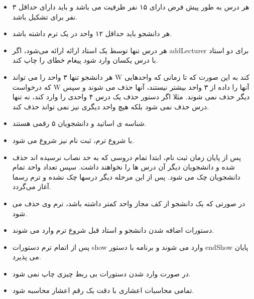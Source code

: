 \documentclass[]{article}
\begin{document}
\begin{itemize}

\item
هر درس به طور پیش فرض دارای ۱۵ نفر ظرفیت می باشد و باید دارای حداقل ۳ نفر برای تشکیل باشد.
	
\item	
هر دانشجو باید حداقل ۱۲ واحد در یک ترم داشته باشد.
\item	
هر درس تنها توسط یک استاد ارائه ارائه می‌شود، اگر addLecturer برای دو استاد با درس یکسان وارد شود پیغام خطای  را چاپ کند.
\item	
هر دانشجو تنها ۳ واحد را می تواند  W کند به این صورت که تا زمانی که واحدهایی که درخواست  W آنها را داده از ۳ واحد بیشتر نیستند، آنها حذف می شوند و سپس دیگر حذف نمی شوند. مثلا اگر دستور حذف یک درس ۴ واحدی را وارد کند، نه تنها درس حذف نمی شود بلکه هیچ واحد دیگری نیز نمی تواند حذف کند.
\item
شناسه ی اساتید و دانشجویان ۵ رقمی هستند. 
\item
با شروع ترم، ثبت نام نیز شروع می شود.
\item
پس از پایان زمان ثبت نام، ابتدا تمام دروسی که به حد نصاب نرسیده اند حذف شده و دانشجویان دیگر آن درس ها را نخواهند داشت. سپس تعداد واحد تمام دانشجویان چک می شود. پس از این مرحله دیگر درسها چک نشده و ترم رسما آغاز می‌گردد.
\item
در صورتی که یک دانشجو از کف مجاز واحد کمتر داشته باشد، ترم وی حذف می شود.
\item
دستورات اضافه شدن دانشجو و استاد قبل شروع ترم وارد می شوند. 
\item
پس از اتمام ترم دستورات show وارد می شوند و برنامه با دستور endShow پایان می پذیرد.
\item
در صورت وارد شدن دستورات بی ربط چیزی چاپ نمی شود.
\item
تمامی محاسبات اعشاری با دقت یک رقم اعشار محاسبه شود.
	
\end{itemize}
\newpage
\thispagestyle{empty}
\end{document}
